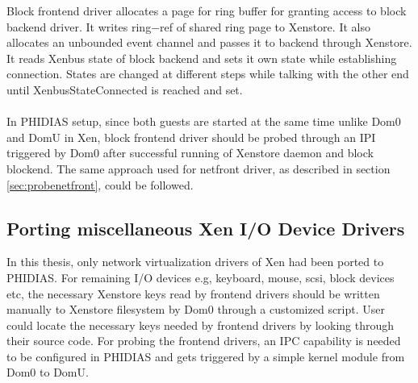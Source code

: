 Block frontend driver allocates a page for ring buffer for granting access to block backend driver. It writes ring−ref of shared ring page to Xenstore. It also allocates an unbounded event channel and passes it to backend through Xenstore. It reads Xenbus state of block backend and sets it own state while establishing connection. States are changed at different steps while talking with the other end until XenbusStateConnected is reached and set.
\\
\\
In PHIDIAS setup, since both guests are started at the same time unlike Dom0 and DomU in Xen, block frontend driver should be probed through an IPI triggered by Dom0 after successful running of Xenstore daemon and block blockend. The same approach used for netfront driver, as described in section \ref{sec:probenetfront}, could be followed.

\subsection{Porting miscellaneous Xen I/O Device Drivers \label{sec:misc}}
In this thesis, only network virtualization drivers of Xen had been ported to PHIDIAS. For remaining I/O devices e.g, keyboard, mouse, scsi, block devices etc, the necessary Xenstore keys read by frontend drivers should be written manually to Xenstore filesystem by Dom0 through a customized script. User could locate the necessary keys needed by frontend drivers by looking through their source code. For probing the frontend drivers, an IPC capability is needed to be configured in PHIDIAS and gets triggered by a simple kernel module from Dom0 to DomU.
